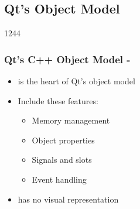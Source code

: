 %
%
%
%

\subsection{Qt's Object Model}

\begin{slide}{1244}
  \frametitle{Qt's C++ Object Model - }
  \begin{itemize}
  \item {} is the heart of Qt's object model
  \item Include these features:
    \begin{itemize}
    \item Memory management
    \item Object properties
    \item Signals and slots
    \item Event handling
   \end{itemize}
  \item {} has no visual representation

 \end{itemize}
\end{slide}



